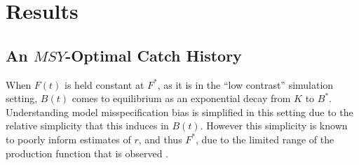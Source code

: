 
%
%


\section{Results}

%
\vspace{-0.45cm}
\subsection{An $MSY$-Optimal Catch History \label{flat}}

%
When $F(t)$ is held constant at $F^*$, as it is in the ``low contrast''
simulation setting, $B(t)$ comes to equilibrium as an exponential decay from
$K$ to $B^*$. Understanding model misspecification bias is simplified in this
setting due to the relative simplicity that this induces in $B(t)$. However
this simplicity is known to poorly inform estimates of $r$, and thus $F^*$,
due to the limited range of the production function that is observed
\cite{hilborn_quantitative_1992}.




